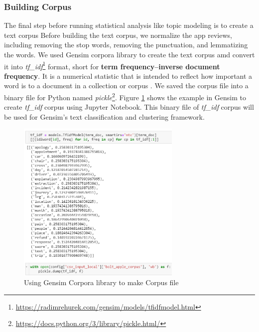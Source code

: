 \documentclass[12pt]{article}
\begin{document}
\subsubsection{Building Corpus}
The final step before running statistical analysis like topic modeling \cite{text_corpus} is to create a text corpus Before building the text corpus, we normalize the app reviews, including removing the stop words, removing the punctuation, and lemmatizing the words.  We used Gensim corpora library \cite{gensim} to create the text corpus amd convert it into \textit{tf\_idf}\footnote{\url{https://radimrehurek.com/gensim/models/tfidfmodel.html}} format, short for \textbf{term frequency–inverse document frequency}. It is a numerical statistic that is intended to reflect how important a word is to a document in a collection or corpus \cite{rajaraman_ullman_2011}. We saved the corpus file into a binary file for Python named \textit{pickle}\footnote{\url{https://docs.python.org/3/library/pickle.html/}}. Figure \ref{fig:img_corpus} shows the example in Gensim to create \textit{tf\_idf} corpus using Jupyter Notebook. This binary file of \textit{tf\_idf} corpus will be used for Gensim's text classification and clustering framework.


\begin{figure}[!h]
\begin{center}
\includegraphics[width=0.7\textwidth]{figures/image19.png}
\caption{Using Gensim Corpora library to make Corpus file}
\label{fig:img_corpus}
\end{center}
\end{figure}

\newpage
\end{document}

